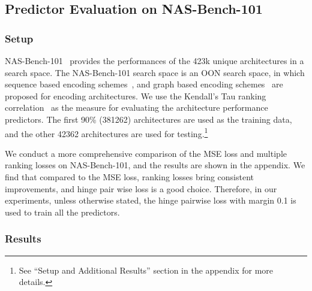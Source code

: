 \documentclass[runningheads]{llncs}
\begin{document}
\subsection{Predictor Evaluation on NAS-Bench-101}
\label{sec:exp-nasbench}

\subsubsection{Setup}
NAS-Bench-101~\cite{ying2019bench} provides the performances of the 423k unique architectures in a search space. The NAS-Bench-101 search space is an OON search space, in which sequence based encoding schemes~\cite{wang2018alphax}, and graph based encoding schemes~\cite{shi2019multi} are proposed for encoding architectures. We use the Kendall's Tau ranking correlation~\cite{sen1968estimates} as the measure for evaluating the architecture performance predictors. The first 90\% (381262) architectures are used as the training data, and the other 42362 architectures are used for testing.\footnote{See ``Setup and Additional Results'' section in the appendix for more details.}

We conduct a more comprehensive comparison of the MSE loss and multiple ranking losses on NAS-Bench-101, and the results are shown in the appendix. We find that compared to the MSE loss, ranking losses bring consistent improvements, and hinge pair wise loss is a good choice. Therefore, in our experiments, unless otherwise stated, the hinge pairwise loss with margin 0.1 is used to train all the predictors.


\subsubsection{Results}
\label{sec:exp-nasnbech-gates}
\end{document}
